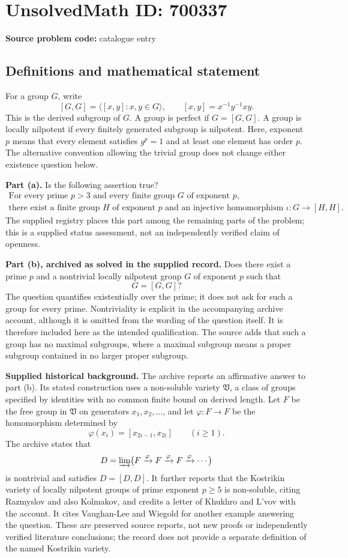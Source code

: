 \documentclass[11pt]{article}
\begin{document}
\section*{UnsolvedMath ID: 700337}
\textbf{Source problem code:} catalogue entry
\subsection{Definitions and mathematical statement}
For a group \(G\), write
\[
[G,G]=\langle [x,y]:x,y\in G\rangle,
\qquad [x,y]=x^{-1}y^{-1}xy.
\]
This is the derived subgroup of \(G\). A group is perfect if \(G=[G,G]\). A group is locally nilpotent if every finitely generated subgroup is nilpotent. Here, exponent \(p\) means that every element satisfies \(g^p=1\) and at least one element has order \(p\). The alternative convention allowing the trivial group does not change either existence question below.

\textbf{Part (a).} Is the following assertion true?
\[
\begin{gathered}
\text{For every prime }p>3\text{ and every finite group }G
\text{ of exponent }p,\\
\text{there exist a finite group }H\text{ of exponent }p
\text{ and an injective homomorphism }\iota:G\longrightarrow[H,H].
\end{gathered}
\]
The supplied registry places this part among the remaining parts of the problem; this is a supplied status assessment, not an independently verified claim of openness.

\textbf{Part (b), archived as solved in the supplied record.} Does there exist a prime \(p\) and a nontrivial locally nilpotent group \(G\) of exponent \(p\) such that
\[
G=[G,G]?
\]
The question quantifies existentially over the prime; it does not ask for such a group for every prime. Nontriviality is explicit in the accompanying archive account, although it is omitted from the wording of the question itself. It is therefore included here as the intended qualification. The source adds that such a group has no maximal subgroups, where a maximal subgroup means a proper subgroup contained in no larger proper subgroup.

\textbf{Supplied historical background.} The archive reports an affirmative answer to part (b). Its stated construction uses a non-soluble variety \(\mathfrak V\), a class of groups specified by identities with no common finite bound on derived length. Let \(F\) be the free group in \(\mathfrak V\) on generators \(x_1,x_2,\ldots\), and let \(\varphi:F\to F\) be the homomorphism determined by
\[
\varphi(x_i)=[x_{2i-1},x_{2i}]\qquad(i\geq1).
\]
The archive states that
\[
D=\varinjlim\bigl(F\xrightarrow{\varphi}F\xrightarrow{\varphi}F\xrightarrow{\varphi}\cdots\bigr)
\]
is nontrivial and satisfies \(D=[D,D]\). It further reports that the Kostrikin variety of locally nilpotent groups of prime exponent \(p\geq5\) is non-soluble, citing Razmyslov and also Kolmakov, and credits a letter of Khukhro and L'vov with the account. It cites Vaughan-Lee and Wiegold for another example answering the question. These are preserved source reports, not new proofs or independently verified literature conclusions; the record does not provide a separate definition of the named Kostrikin variety.
\end{document}
